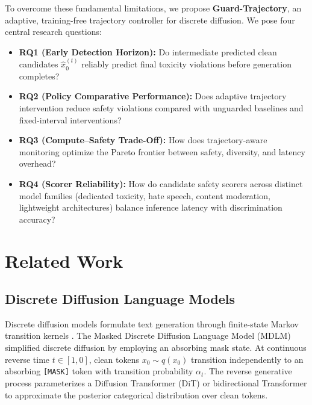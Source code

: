\documentclass[conference]{IEEEtran}
\begin{document}
To overcome these fundamental limitations, we propose \textbf{Guard-Trajectory}, an adaptive, training-free trajectory controller for discrete diffusion. We pose four central research questions:
\begin{itemize}
    \item \textbf{RQ1 (Early Detection Horizon):} Do intermediate predicted clean candidates $\hat{x}_0^{(t)}$ reliably predict final toxicity violations before generation completes?
    \item \textbf{RQ2 (Policy Comparative Performance):} Does adaptive trajectory intervention reduce safety violations compared with unguarded baselines and fixed-interval interventions?
    \item \textbf{RQ3 (Compute--Safety Trade-Off):} How does trajectory-aware monitoring optimize the Pareto frontier between safety, diversity, and latency overhead?
    \item \textbf{RQ4 (Scorer Reliability):} How do candidate safety scorers across distinct model families (dedicated toxicity, hate speech, content moderation, lightweight architectures) balance inference latency with discrimination accuracy?
\end{itemize}

\section{Related Work}

\subsection{Discrete Diffusion Language Models}
Discrete diffusion models formulate text generation through finite-state Markov transition kernels \cite{sohl2015deep,austin2021structured}. The Masked Discrete Diffusion Language Model (MDLM) \cite{sahoo2024simple} simplified discrete diffusion by employing an absorbing mask state. At continuous reverse time $t \in [1, 0]$, clean tokens $x_0 \sim q(x_0)$ transition independently to an absorbing \texttt{[MASK]} token with transition probability $\alpha_t$. The reverse generative process parameterizes a Diffusion Transformer (DiT) or bidirectional Transformer to approximate the posterior categorical distribution over clean tokens.
\end{document}
